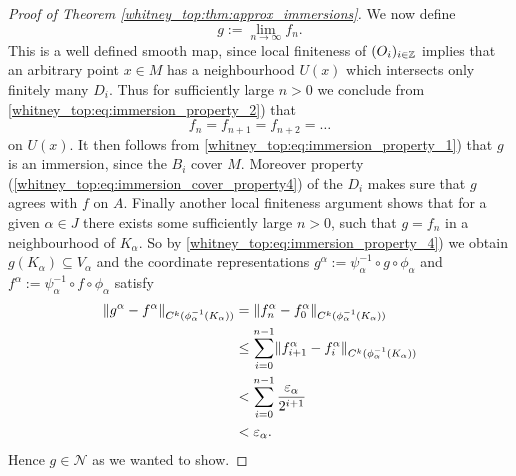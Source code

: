 \begin{proof}[Proof of Theorem \ref{whitney_top:thm:approx_immersions}]
    We now define 
    \[
    g := \lim_{n \to \infty} f_n.
    \]
    This is a well defined smooth map, since local finiteness of $(O_i)_{i \in \mathbb{Z}}$ implies that an arbitrary point $x \in M$ has a neighbourhood $U(x)$ which intersects only finitely many $D_i$. Thus for sufficiently large $n > 0$ we conclude from \ref{whitney_top:eq:immersion_property_2}) that
    \[
    f_n = f_{n+1} = f_{n+2} = \ldots
    \]
    on $U(x)$. It then follows from \ref{whitney_top:eq:immersion_property_1}) that $g$ is an immersion, since the $B_i$ cover $M$. Moreover property (\ref{whitney_top:eq:immersion_cover_property4}) of the $D_i$ makes sure that $g$ agrees with $f$ on $A$. Finally another local finiteness argument shows that for a given $\alpha \in J$ there exists some sufficiently large $n > 0$, such that $g = f_{n}$ in a neighbourhood of $K_\alpha$. So by \ref{whitney_top:eq:immersion_property_4}) we obtain $g(K_\alpha) \subseteq V_\alpha$ and the coordinate representations $g^\alpha := \psi^{-1}_\alpha \circ g \circ \phi_\alpha$ and $f^\alpha := \psi^{-1}_\alpha \circ f \circ \phi_\alpha$ satisfy 
    \begin{align*}
        \lVert g^\alpha - f^\alpha\rVert_{C^k(\phi_\alpha^{-1}(K_\alpha))} &= \lVert f_{n}^\alpha - f_{0}^\alpha\rVert_{C^k(\phi_\alpha^{-1}(K_\alpha))} \\
        & \leq \sum_{i = 0}^{n -1 } \lVert f_{i+1}^\alpha - f_{i}^\alpha\rVert_{C^k(\phi_\alpha^{-1}(K_\alpha))} \\
        & < \sum_{i = 0}^{n -1} \frac{\varepsilon_\alpha}{2^{i+1}} \\
        & < \varepsilon_\alpha.
    \end{align*}
    Hence $g \in \mathcal{N}$ as we wanted to show. 


\end{proof}
